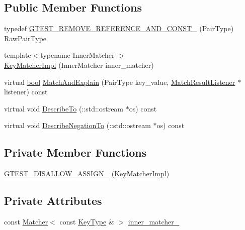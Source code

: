 \subsection*{Public Member Functions}
\begin{DoxyCompactItemize}
\item 
typedef \hyperlink{classtesting_1_1internal_1_1KeyMatcherImpl_a006551fc32e5aef0d319a304ddc5f383}{G\+T\+E\+S\+T\+\_\+\+R\+E\+M\+O\+V\+E\+\_\+\+R\+E\+F\+E\+R\+E\+N\+C\+E\+\_\+\+A\+N\+D\+\_\+\+C\+O\+N\+S\+T\+\_\+} (Pair\+Type) Raw\+Pair\+Type
\item 
{\footnotesize template$<$typename Inner\+Matcher $>$ }\\\hyperlink{classtesting_1_1internal_1_1KeyMatcherImpl_a9ad2a218b0366cae9fb09e82347bd8e7}{Key\+Matcher\+Impl} (Inner\+Matcher inner\+\_\+matcher)
\item 
virtual \hyperlink{classbool}{bool} \hyperlink{classtesting_1_1internal_1_1KeyMatcherImpl_ae821c96473c6400defbb21eb9eca8d4c}{Match\+And\+Explain} (Pair\+Type key\+\_\+value, \hyperlink{classtesting_1_1MatchResultListener}{Match\+Result\+Listener} $\ast$listener) const
\item 
virtual void \hyperlink{classtesting_1_1internal_1_1KeyMatcherImpl_af024a1774c1aedae7b1dc532df7e27af}{Describe\+To} (\+::std\+::ostream $\ast$os) const
\item 
virtual void \hyperlink{classtesting_1_1internal_1_1KeyMatcherImpl_a4be87d136547063a16777151b691046d}{Describe\+Negation\+To} (\+::std\+::ostream $\ast$os) const
\end{DoxyCompactItemize}
\subsection*{Private Member Functions}
\begin{DoxyCompactItemize}
\item 
\hyperlink{classtesting_1_1internal_1_1KeyMatcherImpl_ae5d4d320962433b59e5518b4ede98e67}{G\+T\+E\+S\+T\+\_\+\+D\+I\+S\+A\+L\+L\+O\+W\+\_\+\+A\+S\+S\+I\+G\+N\+\_\+} (\hyperlink{classtesting_1_1internal_1_1KeyMatcherImpl}{Key\+Matcher\+Impl})
\end{DoxyCompactItemize}
\subsection*{Private Attributes}
\begin{DoxyCompactItemize}
\item 
const \hyperlink{classtesting_1_1Matcher}{Matcher}$<$ const \hyperlink{classtesting_1_1internal_1_1KeyMatcherImpl_a9bd63b699518bd9868ba24766547667a}{Key\+Type} \& $>$ \hyperlink{classtesting_1_1internal_1_1KeyMatcherImpl_a7b81235a36e13af4d4be7d08f07ba286}{inner\+\_\+matcher\+\_\+}
\end{DoxyCompactItemize}


